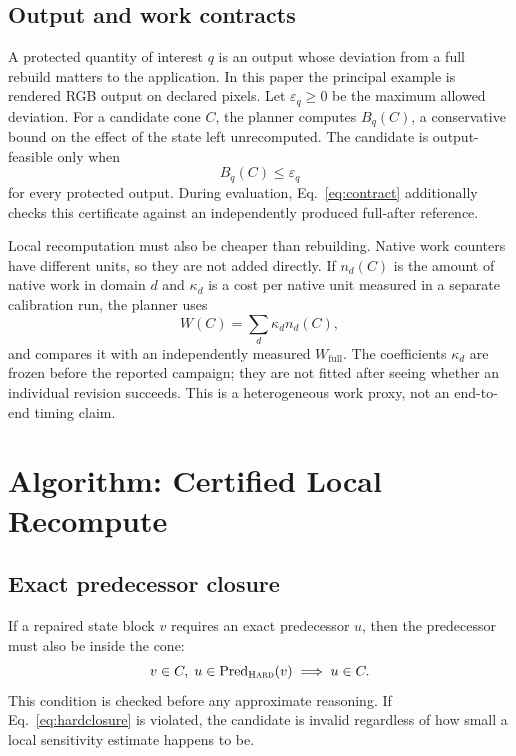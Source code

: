 \documentclass[acmtog,nonacm]{acmart}
\newcommand{\hard}{\textsc{Hard}}
\begin{document}
\subsection{Output and work contracts}
A protected quantity of interest $q$ is an output whose deviation from a full rebuild matters to the application. In this paper the principal example is rendered RGB output on declared pixels. Let $\varepsilon_q\ge0$ be the maximum allowed deviation. For a candidate cone $C$, the planner computes $B_q(C)$, a conservative bound on the effect of the state left unrecomputed. The candidate is output-feasible only when
\begin{equation}
B_q(C)\le\varepsilon_q
\end{equation}
for every protected output. During evaluation, Eq.~\ref{eq:contract} additionally checks this certificate against an independently produced full-after reference.

Local recomputation must also be cheaper than rebuilding. Native work counters have different units, so they are not added directly. If $n_d(C)$ is the amount of native work in domain $d$ and $\kappa_d$ is a cost per native unit measured in a separate calibration run, the planner uses
\begin{equation}
W(C)=\sum_d \kappa_d n_d(C),
\label{eq:work}
\end{equation}
and compares it with an independently measured $W_{\mathrm{full}}$. The coefficients $\kappa_d$ are frozen before the reported campaign; they are not fitted after seeing whether an individual revision succeeds. This is a heterogeneous work proxy, not an end-to-end timing claim.

\section{Algorithm: Certified Local Recompute}
\subsection{Exact predecessor closure}
If a repaired state block $v$ requires an exact predecessor $u$, then the predecessor must also be inside the cone:
\begin{equation}
 v\in C,\; u\in\mathrm{Pred}_{\hard}(v) \;\Longrightarrow\; u\in C.
\label{eq:hardclosure}
\end{equation}
This condition is checked before any approximate reasoning. If Eq.~\ref{eq:hardclosure} is violated, the candidate is invalid regardless of how small a local sensitivity estimate happens to be.
\end{document}
